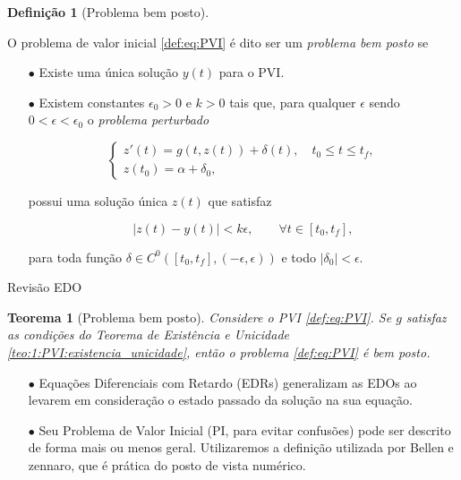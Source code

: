 \documentclass{beamer}
\theoremstyle{plain}
\newtheorem{teo}{Teorema}
\theoremstyle{definition}
\newtheorem{defi}{Definição}
\begin{document}
\begin{frame}
    \begin{defi}[Problema bem posto]
         \label{def:3:problema_bem_posto}
            
         O problema de valor inicial \eqref{def:eq:PVI} é dito ser um \textit{problema bem posto} se 
         \begin{itemize}
             \item[$\bullet$] Existe uma única solução $y(t)$ para o PVI.
         \item[$\bullet$] Existem constantes $\epsilon_0 > 0$ e $k>0$ tais que, para qualquer $\epsilon $ sendo $0 < \epsilon < \epsilon_0$ o \textit{problema perturbado}


         \begin{equation*}
             \begin{cases}
                 z'(t) = g(t, z(t))+\delta(t), \quad  t_0 \leq t \leq t_f, \\
                 z(t_0)=\alpha+\delta_0,
             \end{cases}
         \end{equation*}

         possui uma solução única $z(t)$ que satisfaz

         \begin{equation*}
             |z(t)-y(t)|<k \epsilon, \qquad \forall t \in [t_0, t_f],
         \end{equation*} 
        
         para toda função $\delta \in C^0([t_0, t_f], (-\epsilon, \epsilon))$ e todo $|\delta_0| < \epsilon$.
         \end{itemize}

     \end{defi}
\end{frame}


\begin{frame}{Revisão EDO}
    \begin{teo}[Problema bem posto]
        \label{teo:2:problema_bem_posto}
        Considere o PVI \eqref{def:eq:PVI}. Se $g$ satisfaz as condições do Teorema de Existência
        e Unicidade \ref{teo:1:PVI:existencia_unicidade}, então o problema \eqref{def:eq:PVI} é bem posto.
    \end{teo}

        \begin{itemize}
            \item[$\bullet$] Equações Diferenciais com Retardo (EDRs) generalizam as EDOs ao levarem em consideração o estado passado da solução na sua equação.
            \item[$\bullet$] Seu Problema de Valor Inicial (PI, para evitar confusões) pode ser descrito de forma mais ou menos geral. Utilizaremos a definição utilizada por {\color{red} Bellen e zennaro}, que é prática do posto de vista numérico.
        \end{itemize}


\end{frame}
\end{document}
